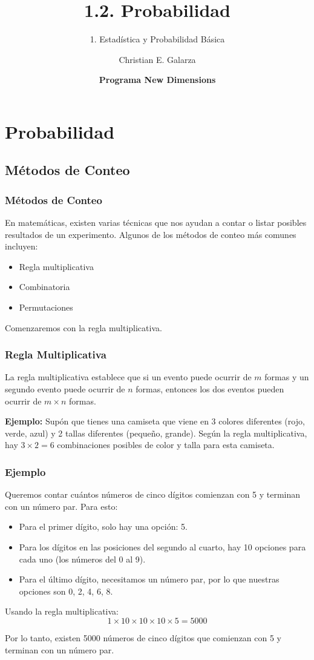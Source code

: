 \documentclass[aspectratio=169]{beamer}
\title[1.2. Probabilidad]{\Huge 1.2. Probabilidad}
\subtitle{1. Estadística y Probabilidad Básica}
\author{Christian E. Galarza}
\date{\bf Programa New Dimensions}
\begin{document}
\frame{\titlepage}

\section{Probabilidad}

\subsection{Métodos de Conteo}
\begin{frame}
\frametitle{Métodos de Conteo}
En matemáticas, existen varias técnicas que nos ayudan a contar o listar posibles resultados de un experimento. Algunos de los métodos de conteo más comunes incluyen:

\begin{itemize}
\item Regla multiplicativa
\item Combinatoria
\item Permutaciones
\end{itemize}

Comenzaremos con la regla multiplicativa.
\end{frame}

\begin{frame}
\frametitle{Regla Multiplicativa}
La regla multiplicativa establece que si un evento puede ocurrir de \(m\) formas y un segundo evento puede ocurrir de \(n\) formas, entonces los dos eventos pueden ocurrir de \(m \times n\) formas.

\vfill

\textbf{Ejemplo:} Supón que tienes una camiseta que viene en 3 colores diferentes (rojo, verde, azul) y 2 tallas diferentes (pequeño, grande). Según la regla multiplicativa, hay \(3 \times 2 = 6\) combinaciones posibles de color y talla para esta camiseta.
\end{frame}


\begin{frame}
\frametitle{Ejemplo}
Queremos contar cuántos números de cinco dígitos comienzan con 5 y terminan con un número par. Para esto:

\begin{itemize}
\item Para el primer dígito, solo hay una opción: 5.
\item Para los dígitos en las posiciones del segundo al cuarto, hay 10 opciones para cada uno (los números del 0 al 9).
\item Para el último dígito, necesitamos un número par, por lo que nuestras opciones son 0, 2, 4, 6, 8.
\end{itemize}

Usando la regla multiplicativa:
\[1 \times 10 \times 10 \times 10 \times 5 = 5000\]

Por lo tanto, existen 5000 números de cinco dígitos que comienzan con 5 y terminan con un número par.
\end{frame}
\end{document}
